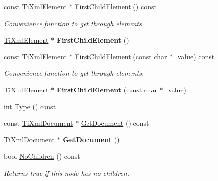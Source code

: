 \begin{DoxyCompactItemize}
const \hyperlink{classTiXmlElement}{Ti\+Xml\+Element} $\ast$ \hyperlink{classTiXmlNode_a12c973e1da9e90a178924b8ea5a5f4d1}{First\+Child\+Element} () const
\begin{DoxyCompactList}\small\item\em Convenience function to get through elements. \end{DoxyCompactList}\item 
\mbox{\label{classTiXmlNode_aa0fecff1f3866ab33a8a25506e95db1d}} 
\hyperlink{classTiXmlElement}{Ti\+Xml\+Element} $\ast$ {\bfseries First\+Child\+Element} ()
\item 
\mbox{\label{classTiXmlNode_aab23fca4c2455c1d926c35d85a663842}} 
const \hyperlink{classTiXmlElement}{Ti\+Xml\+Element} $\ast$ \hyperlink{classTiXmlNode_aab23fca4c2455c1d926c35d85a663842}{First\+Child\+Element} (const char $\ast$\+\_\+value) const
\begin{DoxyCompactList}\small\item\em Convenience function to get through elements. \end{DoxyCompactList}\item 
\mbox{\label{classTiXmlNode_a6936ae323675071808ac4840379e57f5}} 
\hyperlink{classTiXmlElement}{Ti\+Xml\+Element} $\ast$ {\bfseries First\+Child\+Element} (const char $\ast$\+\_\+value)
\item 
int \hyperlink{classTiXmlNode_a0f4dd916b2afc2ab2f1a84f3e2b8fd5d}{Type} () const
\item 
const \hyperlink{classTiXmlDocument}{Ti\+Xml\+Document} $\ast$ \hyperlink{classTiXmlNode_adcb070acefcbaedaa0673d82e530538b}{Get\+Document} () const
\item 
\mbox{\label{classTiXmlNode_a7b2372c0e7adfb32f5b6902fe49a39b2}} 
\hyperlink{classTiXmlDocument}{Ti\+Xml\+Document} $\ast$ {\bfseries Get\+Document} ()
\item 
\mbox{\label{classTiXmlNode_abe85e0ec04ea59c033f324c8504653e5}} 
bool \hyperlink{classTiXmlNode_abe85e0ec04ea59c033f324c8504653e5}{No\+Children} () const
\begin{DoxyCompactList}\small\item\em Returns true if this node has no children. \end{DoxyCompactList}\item 

\end{DoxyCompactItemize}
